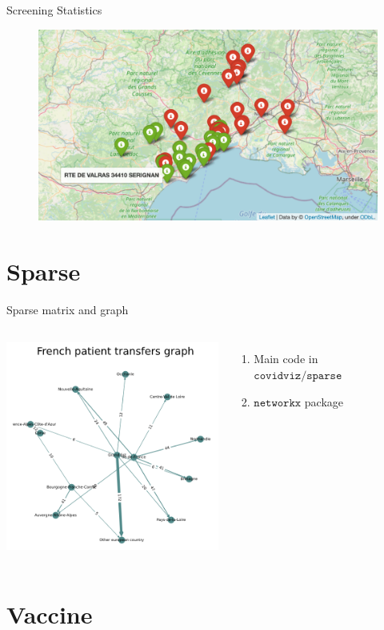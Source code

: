 \documentclass[11pt, compress, tikz, xcolor=table]{beamer}
\theoremstyle{definition}
\begin{document}
\begin{frame}[fragile]{Screening Statistics} 
\begin{figure}
    \centering
    \includegraphics[width= 9 cm]{images/screening_map.png}
\end{figure}

\end{frame}

\section{Sparse}
\begin{frame}[fragile]{Sparse matrix and graph} 
    \begin{columns}
             \centering
             \includegraphics[height=7cm, width=7cm]{images/graph.png}
              \textbf{} \begin{enumerate}
                  \item Main code in $\texttt{covidviz/sparse}$
                  \item $\texttt{networkx}$ package
              \end{enumerate}
         \end{columns} 
\end{frame}


\section{Vaccine}
\end{document}
